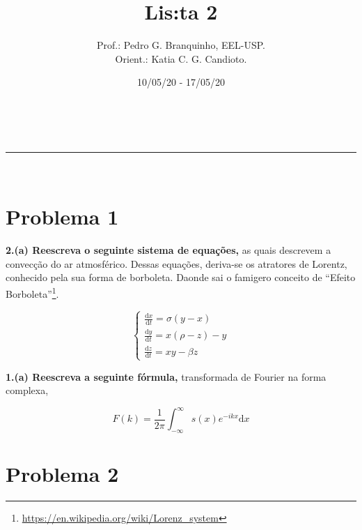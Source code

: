 \documentclass[a4paper,11pt, dvipdfmx]{abntex2}
\makeatletter
\newcommand{\linia}{\rule{\linewidth}{0.5pt}}
\theoremstyle{mytheor}
\renewcommand{\maketitle}{
  \begin{center}
    \vspace{4ex}
    { {\fontsize{40}{40}\selectfont \textfrak{\@title}} }
    \vspace{2ex}
    \\
    \linia\\
    \@author \hfill \@date
    \vspace{6ex}
  \end{center}
}
\makeatother
\begin{document}
  \title{Lis:ta 2}

  \author{\indent  Prof.: Pedro G. Branquinho, EEL-USP. \\
    Orient.: Katia C. G. Candioto.}

  \date{10/05/20 - 17/05/20}

  \maketitle

  \section*{Problema 1}
\textbf{2.(a) Reescreva o seguinte sistema de equações,} as quais
descrevem a convecção do ar atmosférico. Dessas equações, deriva-se os
atratores de Lorentz, conhecido pela sua forma de borboleta. Daonde
sai o famigero conceito de ``Efeito Borboleta''\footnote{\url{https://en.wikipedia.org/wiki/Lorenz_system}}.

\begin{equation}
  \label{eq:boboleta}
  \begin{cases}
    \frac{\mathrm{d}x}{\mathrm{d}t} = \sigma (y - x) \\
    \frac{\mathrm{d}y}{\mathrm{d}t} = x(\rho - z) - y\\
    \frac{\mathrm{d}z}{\mathrm{d}t} = x y - \beta z
  \end{cases}
\end{equation}





  \clearpage

\noident\textbf{1.(a) Reescreva a seguinte fórmula,} transformada de
Fourier na forma complexa,

\begin{equation}
  F(k) = \frac{1}{2 \pi} \int_{-\infty}^{\infty}{s(x)e^{-ikx} \mathrm{d}x}
\end{equation}

\section*{Problema 2}
\end{document}
